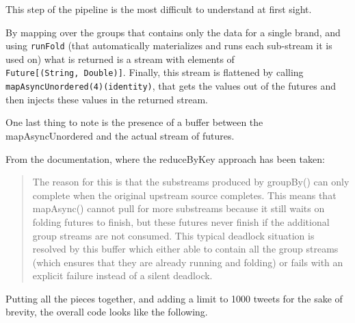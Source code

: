 This step of the pipeline is the most difficult to understand at first
sight.

By mapping over the groups that contains only the data for a single
brand, and using \texttt{runFold} (that automatically materializes and
runs each sub-stream it is used on) what is returned is a stream with
elements of \texttt{Future{[}(String,\ Double){]}}. Finally, this stream
is flattened by calling \texttt{mapAsyncUnordered(4)(identity)}, that
gets the values out of the futures and then injects these values in the
returned stream.

One last thing to note is the presence of a buffer between the
mapAsyncUnordered and the actual stream of futures.

From the documentation, where the reduceByKey approach has been taken:

\begin{quote}
The reason for this is that the substreams produced by groupBy() can
only complete when the original upstream source completes. This means
that mapAsync() cannot pull for more substreams because it still waits
on folding futures to finish, but these futures never finish if the
additional group streams are not consumed. This typical deadlock
situation is resolved by this buffer which either able to contain all
the group streams (which ensures that they are already running and
folding) or fails with an explicit failure instead of a silent deadlock.
\end{quote}

Putting all the pieces together, and adding a limit to 1000 tweets for
the sake of brevity, the overall code looks like the following.

